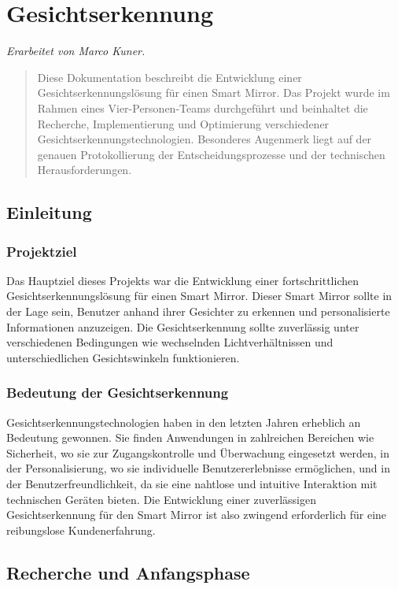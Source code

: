 \chapter{Gesichtserkennung}
\textit{Erarbeitet von Marco Kuner.}

\begin{abstract}
Diese Dokumentation beschreibt die Entwicklung einer Gesichtserkennungslösung für einen Smart Mirror. Das Projekt wurde im Rahmen eines Vier-Personen-Teams durchgeführt und beinhaltet die Recherche, Implementierung und Optimierung verschiedener Gesichtserkennungstechnologien. Besonderes Augenmerk liegt auf der genauen Protokollierung der Entscheidungsprozesse und der technischen Herausforderungen.
\end{abstract}



\section{Einleitung}

\subsection{Projektziel}
Das Hauptziel dieses Projekts war die Entwicklung einer fortschrittlichen Gesichtserkennungslösung für einen Smart Mirror. Dieser Smart Mirror sollte in der Lage sein, Benutzer anhand ihrer Gesichter zu erkennen und personalisierte Informationen anzuzeigen. Die Gesichtserkennung sollte zuverlässig unter verschiedenen Bedingungen wie wechselnden Lichtverhältnissen und unterschiedlichen Gesichtswinkeln funktionieren.

\subsection{Bedeutung der Gesichtserkennung}
Gesichtserkennungstechnologien haben in den letzten Jahren erheblich an Bedeutung gewonnen. Sie finden Anwendungen in zahlreichen Bereichen wie Sicherheit, wo sie zur Zugangskontrolle und Überwachung eingesetzt werden, in der Personalisierung, wo sie individuelle Benutzererlebnisse ermöglichen, und in der Benutzerfreundlichkeit, da sie eine nahtlose und intuitive Interaktion mit technischen Geräten bieten. Die Entwicklung einer zuverlässigen Gesichtserkennung für den Smart Mirror ist also zwingend erforderlich für eine reibungslose Kundenerfahrung.



\section{Recherche und Anfangsphase}

